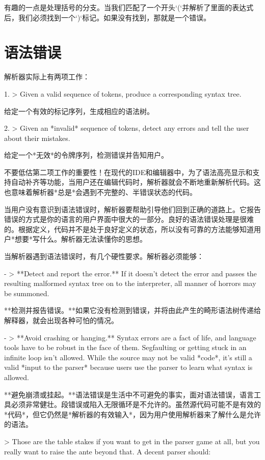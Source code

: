 \documentclass[cn,11pt,chinese]{elegantbook}
\begin{document}
有趣的一点是处理括号的分支。当我们匹配了一个开头`(`并解析了里面的表达式后，我们必须找到一个`)`标记。如果没有找到，那就是一个错误。

\section{语法错误}

解析器实际上有两项工作：

1. > Given a valid sequence of tokens, produce a corresponding syntax tree.

   给定一个有效的标记序列，生成相应的语法树。

2. > Given an *invalid* sequence of tokens, detect any errors and tell the user about their mistakes.

   给定一个*无效*的令牌序列，检测错误并告知用户。

不要低估第二项工作的重要性！在现代的IDE和编辑器中，为了语法高亮显示和支持自动补齐等功能，当用户还在编辑代码时，解析器就会不断地重新解析代码。这也意味着解析器*总是*会遇到不完整的、半错误状态的代码。

当用户没有意识到语法错误时，解析器要帮助引导他们回到正确的道路上。它报告错误的方式是你的语言的用户界面中很大的一部分。良好的语法错误处理是很难的。根据定义，代码并不是处于良好定义的状态，所以没有可靠的方法能够知道用户*想要*写什么。解析器无法读懂你的思想。

当解析器遇到语法错误时，有几个硬性要求。解析器必须能够：

- > **Detect and report the error.** If it doesn’t detect the error and passes the resulting malformed syntax tree on to the interpreter, all manner of horrors may be summoned.

  **检测并报告错误。**如果它没有检测到错误，并将由此产生的畸形语法树传递给解释器，就会出现各种可怕的情况。

- > **Avoid crashing or hanging.** Syntax errors are a fact of life, and language tools have to be robust in the face of them. Segfaulting or getting stuck in an infinite loop isn’t allowed. While the source may not be valid *code*, it’s still a valid *input to the parser* because users use the parser to learn what syntax is allowed.

  **避免崩溃或挂起。**语法错误是生活中不可避免的事实，面对语法错误，语言工具必须非常健壮。段错误或陷入无限循环是不允许的。虽然源代码可能不是有效的*代码*，但它仍然是*解析器的有效输入*，因为用户使用解析器来了解什么是允许的语法。

> Those are the table stakes if you want to get in the parser game at all, but you really want to raise the ante beyond that. A decent parser should:
\end{document}
